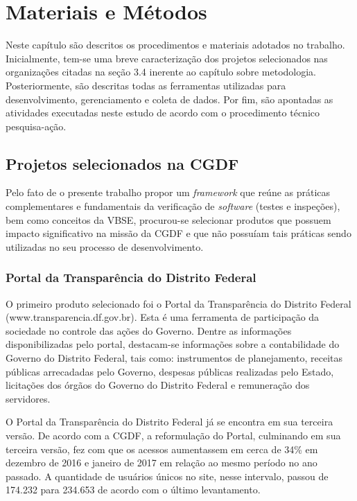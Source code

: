 \chapter{Materiais e Métodos}

Neste capítulo são descritos os procedimentos e materiais adotados no trabalho. Inicialmente, tem-se uma breve caracterização dos projetos selecionados nas organizações citadas na seção 3.4 inerente ao capítulo sobre metodologia. Posteriormente, são descritas todas as ferramentas utilizadas para desenvolvimento, gerenciamento e coleta de dados. Por fim, são apontadas as atividades executadas neste estudo de acordo com o procedimento técnico pesquisa-ação.

\section{Projetos selecionados na CGDF}

Pelo fato de o presente trabalho propor um \textit{framework} que reúne as práticas complementares e fundamentais da verificação de \textit{software} (testes e inspeções), bem como conceitos da VBSE, procurou-se selecionar produtos que possuem impacto significativo na missão da CGDF e que não possuíam tais práticas sendo utilizadas no seu processo de desenvolvimento.

\subsection{Portal da Transparência do Distrito Federal}

O primeiro produto selecionado foi o Portal da Transparência do Distrito Federal (www.transparencia.df.gov.br). Esta é uma ferramenta de participação da sociedade no controle das ações do Governo. Dentre as informações disponibilizadas pelo portal, destacam-se informações sobre a contabilidade do Governo do Distrito Federal, tais como: instrumentos de planejamento, receitas públicas arrecadadas pelo Governo, despesas públicas realizadas pelo Estado, licitações dos órgãos do Governo do Distrito Federal e remuneração dos servidores.

O Portal da Transparência do Distrito Federal já se encontra em sua terceira versão. De acordo com a CGDF, a reformulação do Portal, culminando em sua terceira versão, fez com que os acessos aumentassem em cerca de 34\% em dezembro de 2016 e janeiro de 2017 em relação ao mesmo período no ano passado. A quantidade de usuários únicos no site, nesse intervalo, passou de 174.232 para 234.653 de acordo com o último levantamento.

